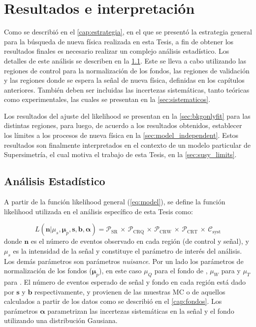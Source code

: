\chapter{Resultados e interpretación}
\label{cap:resultados}

Como se describió en el \cref{cap:estrategia}, en el que se presentó la
estrategia general para la búsqueda de nueva física realizada en esta Tesis, a
fin de obtener los resultados finales es necesario realizar un complejo análisis
estadístico. Los detalles de este análisis se describen en la
\cref{sec:analisis}. Este se lleva a cabo utilizando las regiones de control
para la normalización de los fondos, las regiones de validación y las regiones
donde se espera la señal de nueva física, definidas en los capítulos anteriores.
También deben ser incluidas las incertezas sistemáticas, tanto teóricas como
experimentales, las cuales se presentan en la \cref{sec:sistematicos}.

Los resultados del ajuste del likelihood se presentan en la
\cref{sec:bkgonlyfit} para las distintas regiones, para luego, de acuerdo a los
resultados obtenidos, establecer los límites a los procesos de nueva física en
la \cref{sec:model_independent}. Estos resultados son finalmente interpretados
en el contexto de un modelo particular de Supersimetría, el cual motiva el
trabajo de esta Tesis, en la \cref{sec:susy_limits}.



\section{Análisis Estadístico}
\label{sec:analisis}

A partir de la función likelihood general (\cref{eq:model}), se define la
función likelihood utilizada en el análisis específico de esta Tesis como:

\begin{equation}
  L(\bm{n}|\mu_s, \bm{\mu}_p, \bm{s}, \bm{b}, \bm{\alpha}) = \mathcal{P}_\text{SR} \, \times \, \mathcal{P}_\text{CRQ} \, \times \, \mathcal{P}_\text{CRW} \, \times \, \mathcal{P}_\text{CRT} \, \times \, \mathcal{C}_\text{syst}
  \label{eq:likelihood}
\end{equation}
%
donde $\bm{n}$ es el número de eventos observado en cada región (de control y
señal), y $\mu_s$ es la intensidad de la señal y constituye el parámetro de
interés del análisis. Los demás parámetros son parámetros \emph{nuisance}. Por
un lado los parámetros de normalización de los fondos ($\bm{\mu}_p$), en este
caso $\mu_Q$ para el fondo de {\gjet}, $\mu_W$ para {\wgam} y $\mu_T$ para
{\ttgam}. El número de eventos esperado de señal y fondo en cada región está
dado por $\bm{s}$ y $\bm{b}$ respectivamente, y provienen de las muestras MC o
de aquellos calculados a partir de los datos como se describió en el
\cref{cap:fondos}. Los parámetros $\bm{\alpha}$ parametrizan las incertezas
sistemáticas en la señal y el fondo utilizando una distribución Gausiana.

